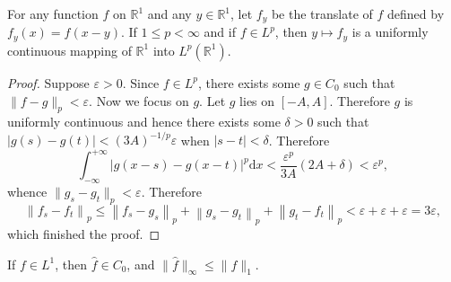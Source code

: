 \begin{theorem}
For any function $f$ on $\mathbb{R}^1$ and any $y\in\mathbb{R}^1$, let $f_y$ be the translate of $f$ defined by $f_y(x)=f(x-y)$. If $1\le p<\infty$ and if $f\in L^p$, then $y\mapsto f_y$ is a uniformly continuous mapping of $\mathbb{R}^1$ into $L^p(\mathbb{R}^1)$.
\end{theorem}
\begin{proof}
Suppose $\varepsilon>0$. Since $f\in L^p$, there exists some $g\in C_0$ such that $\|f-g\|_p<\varepsilon$. Now we focus on $g$. Let $g$ lies on $[-A,A]$. Therefore $g$ is uniformly continuous and hence there exists some $\delta>0$ such that $|g(s)-g(t)|<(3A)^{-1/p}\varepsilon$ when $|s-t|<\delta$. Therefore 
$$
\int_{-\infty}^{+\infty}{\left| g\left( x-s \right) -g\left( x-t \right) \right|^p\mathrm{d}x}<\frac{\varepsilon ^p}{3A}\left( 2A+\delta \right) <\varepsilon ^p,
$$
whence $\|g_s-g_t\|_p<\varepsilon$. Therefore 
$$
\left\| f_s-f_t \right\| _p\le \left\| f_s-g_s \right\| _p+\left\| g_s-g_t \right\| _p+\left\| g_t-f_t \right\| _p<\varepsilon +\varepsilon +\varepsilon =3\varepsilon ,
$$
which finished the proof.
\end{proof}
\begin{theorem}
If $f\in L^1$, then $\widehat{f}\in C_0$, and $\|\widehat{f}\|_\infty\le\|f\|_1$.
\end{theorem}
